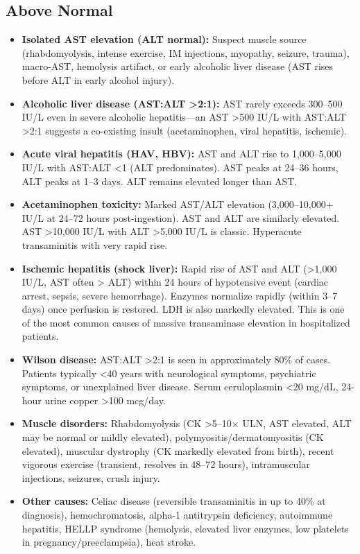 \subsection*{Above Normal}
\begin{itemize}
  \item \textbf{Isolated AST elevation (ALT normal):} Suspect muscle source (rhabdomyolysis, intense exercise, IM injections, myopathy, seizure, trauma), macro-AST, hemolysis artifact, or early alcoholic liver disease (AST rises before ALT in early alcohol injury).
  \item \textbf{Alcoholic liver disease (AST:ALT >2:1):} AST rarely exceeds 300--500 IU/L even in severe alcoholic hepatitis---an AST >500 IU/L with AST:ALT >2:1 suggests a co-existing insult (acetaminophen, viral hepatitis, ischemic).
  \item \textbf{Acute viral hepatitis (HAV, HBV):} AST and ALT rise to 1,000--5,000 IU/L with AST:ALT <1 (ALT predominates). AST peaks at 24--36 hours, ALT peaks at 1--3 days. ALT remains elevated longer than AST.
  \item \textbf{Acetaminophen toxicity:} Marked AST/ALT elevation (3,000--10,000+ IU/L at 24--72 hours post-ingestion). AST and ALT are similarly elevated. AST >10,000 IU/L with ALT >5,000 IU/L is classic. Hyperacute transaminitis with very rapid rise.
  \item \textbf{Ischemic hepatitis (shock liver):} Rapid rise of AST and ALT (>1,000 IU/L, AST often > ALT) within 24 hours of hypotensive event (cardiac arrest, sepsis, severe hemorrhage). Enzymes normalize rapidly (within 3--7 days) once perfusion is restored. LDH is also markedly elevated. This is one of the most common causes of massive transaminase elevation in hospitalized patients.
  \item \textbf{Wilson disease:} AST:ALT >2:1 is seen in approximately 80\% of cases. Patients typically <40 years with neurological symptoms, psychiatric symptoms, or unexplained liver disease. Serum ceruloplasmin <20 mg/dL, 24-hour urine copper >100 mcg/day.
  \item \textbf{Muscle disorders:} Rhabdomyolysis (CK >5--10$\times$ ULN, AST elevated, ALT may be normal or mildly elevated), polymyositis/dermatomyositis (CK elevated), muscular dystrophy (CK markedly elevated from birth), recent vigorous exercise (transient, resolves in 48--72 hours), intramuscular injections, seizures, crush injury.
  \item \textbf{Other causes:} Celiac disease (reversible transaminitis in up to 40\% at diagnosis), hemochromatosis, alpha-1 antitrypsin deficiency, autoimmune hepatitis, HELLP syndrome (hemolysis, elevated liver enzymes, low platelets in pregnancy/preeclampsia), heat stroke.
\end{itemize}


